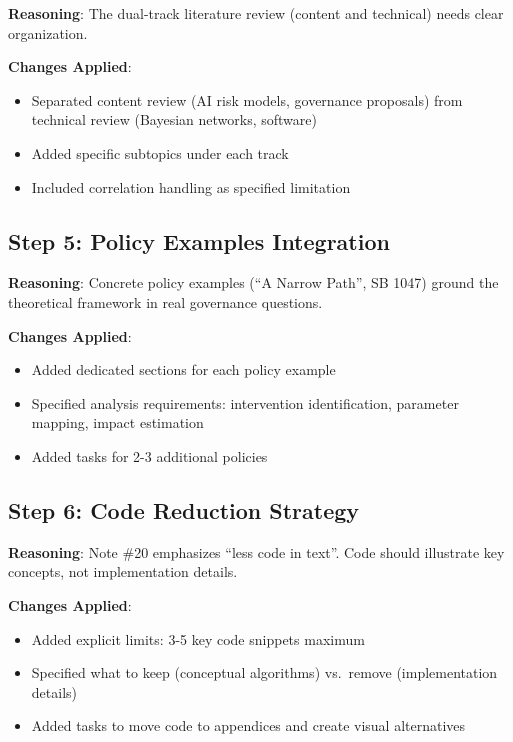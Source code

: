 \documentclass[
  11pt,
  letterpaper,
]{book}
\providecommand{\tightlist}{%
  \setlength{\itemsep}{0pt}\setlength{\parskip}{0pt}}
\begin{document}
\textbf{Reasoning}: The dual-track literature review (content and
technical) needs clear organization.

\textbf{Changes Applied}:

\begin{itemize}
\tightlist
\item
  Separated content review (AI risk models, governance proposals) from
  technical review (Bayesian networks, software)
\item
  Added specific subtopics under each track
\item
  Included correlation handling as specified limitation
\end{itemize}

\subsection{Step 5: Policy Examples
Integration}\label{step-5-policy-examples-integration}

\textbf{Reasoning}: Concrete policy examples (``A Narrow Path'', SB
1047) ground the theoretical framework in real governance questions.

\textbf{Changes Applied}:

\begin{itemize}
\tightlist
\item
  Added dedicated sections for each policy example
\item
  Specified analysis requirements: intervention identification,
  parameter mapping, impact estimation
\item
  Added tasks for 2-3 additional policies
\end{itemize}

\subsection{Step 6: Code Reduction
Strategy}\label{step-6-code-reduction-strategy}

\textbf{Reasoning}: Note \#20 emphasizes ``less code in text''. Code
should illustrate key concepts, not implementation details.

\textbf{Changes Applied}:

\begin{itemize}
\tightlist
\item
  Added explicit limits: 3-5 key code snippets maximum
\item
  Specified what to keep (conceptual algorithms) vs.~remove
  (implementation details)
\item
  Added tasks to move code to appendices and create visual alternatives
\end{itemize}
\end{document}
